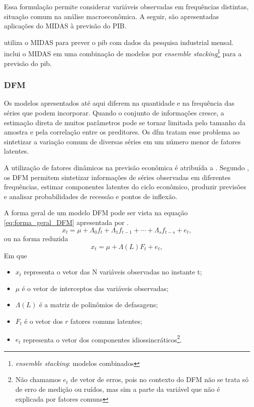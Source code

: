 Essa formulação permite considerar variáveis observadas em frequências distintas, situação comum na análise macroeconômica. A seguir, são apresentadas aplicações do MIDAS à previsão do PIB.


 utiliza o MIDAS para prever o \ac{pib} com dados da pesquisa industrial mensal.  inclui o MIDAS em uma combinação de modelos por \textit{ensemble stacking}\footnote{\textit{ensemble stacking}: modelos combinados} para a previsão do \ac{pib}.

\subsubsection{DFM}

Os modelos apresentados até aqui diferem na quantidade e na frequência das séries que podem incorporar. Quando o conjunto de informações cresce, a estimação direta de muitos parâmetros pode se tornar limitada pelo tamanho da amostra e pela correlação entre os preditores. Os \ac{dfm} tratam esse problema ao sintetizar a variação comum de diversas séries em um número menor de fatores latentes.

A utilização de fatores dinâmicos na previsão econômica é atribuída a . Segundo , os DFM permitem sintetizar informações de séries observadas em diferentes frequências, estimar componentes latentes do ciclo econômico, produzir previsões e analisar probabilidades de recessão e pontos de inflexão.

A forma geral de um modelo DFM pode ser vista na equação \ref{eq:forma_geral_DFM} apresentada por .
\begin{equation}
	x_t = \mu + \Lambda_0f_t + \Lambda_1f_{t-1} + \cdots + \Lambda_sf_{t-s}  + e_t,
\end{equation}
ou na forma reduzida
\begin{equation}
	\label{eq:forma_geral_DFM}
	x_t = \mu + \Lambda (L)F_t + e_t,
\end{equation}
Em que

\begin{itemize}
	\item[a)] $x_t$ representa o vetor das N variáveis observadas no instante t;
	\item[b)] $\mu$ é o vetor de interceptos das variáveis observadas;
	\item[c)] $\Lambda (L)$ é a matriz de polinômios de defasagens;
	\item[d)] $F_t$ é o vetor dos $r$ fatores comuns latentes;
	\item[e)] $e_t$ representa o vetor dos componentes idiossincráticos\footnote{Não chamamos $e_t$ de vetor de erros, pois no contexto do DFM não se trata só de erro de medição ou ruídos, mas sim a parte da variável que não é explicada por fatores comuns}.
\end{itemize}

